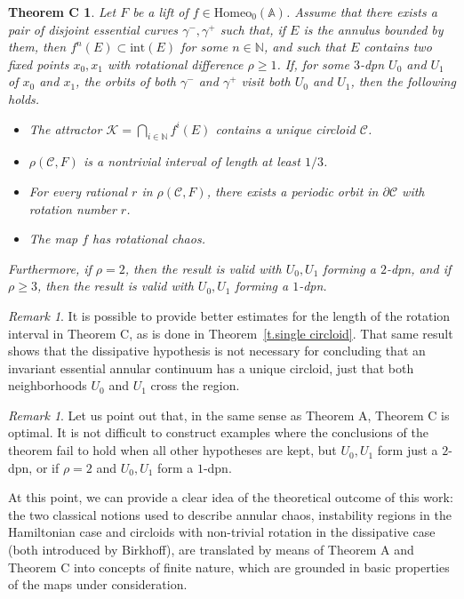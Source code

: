 \documentclass[12pt,a4paper]{amsart}
\newtheorem*{thmC}{Theorem C}
\theoremstyle{definition}
\theoremstyle{remark}
\newtheorem{obs}[thm]{Remark}
\newcommand{\N}{\mathbb{N}}
\newcommand{\homeo}{\mathrm{Homeo}_0(\A)}
\newcommand{\A}{\mathbb{A}}
\begin{document}
\begin{thmC}
Let $F$ be a lift of $f\in\homeo$. Assume that there exists a pair of disjoint essential curves \( \gamma^-, \gamma^+ \) such that, if $E$ is the annulus bounded by them, then  \( f^n(E) \subset \mathrm{int}(E) \) for some \( n \in \mathbb{N} \), and such that $E$ contains two fixed points \( x_0, x_1 \) with rotational difference \( \rho \geq 1 \). If, for some $3$-dpn \( U_0 \) and \( U_1 \) of \( x_0 \) and \( x_1 \), the orbits of both \( \gamma^- \) and \( \gamma^+ \) visit both \( U_0 \) and \( U_1 \), then the following holds.

\begin{itemize}
\item The attractor $\mathcal{K}=\bigcap_{i\in\N} f^i(E)$ contains a unique circloid $\mathcal{C}$.
\item $\rho(\mathcal{C},F)$ is a nontrivial interval of length at least $1/3$.
\item For every rational $r$ in $\rho(\mathcal{C},F)$, there exists a periodic orbit in $\partial \mathcal{C}$ with rotation number $r$.
\item The map $f$ has rotational chaos.
\end{itemize}

Furthermore, if $\rho= 2$, then the result is valid with $U_0,U_1$
forming a $2$-dpn, and if $\rho\ge 3$, then the result is valid with $U_0,U_1$
forming a $1$-dpn.

\end{thmC}


\smallskip
\begin{obs}
It is possible to provide better estimates for the length of the rotation interval in Theorem C, as is done in Theorem~\ref{t.single circloid}. That same result shows that the dissipative hypothesis is not necessary for concluding that an invariant essential annular continuum has a unique circloid, just that both neighborhoods $U_0$ and $U_1$ cross the region.   
\end{obs}

\begin{obs}
Let us point out that, in the same sense as Theorem A, Theorem C is optimal. It is not difficult to construct examples where the conclusions of the theorem fail to hold when all other hypotheses are kept, but $U_0, U_1$ form just a $2$-dpn, or if $\rho=2$ and $U_0, U_1$ form a $1$-dpn.  
\end{obs}

At this point, we can provide a clear idea of the theoretical outcome of this work: the two classical notions used to describe annular chaos, instability regions in the Hamiltonian case and circloids with non-trivial rotation in the dissipative case (both introduced by Birkhoff), are translated by means of Theorem A and Theorem C into concepts of finite nature, which are grounded in basic properties of the maps under consideration.
\end{document}
